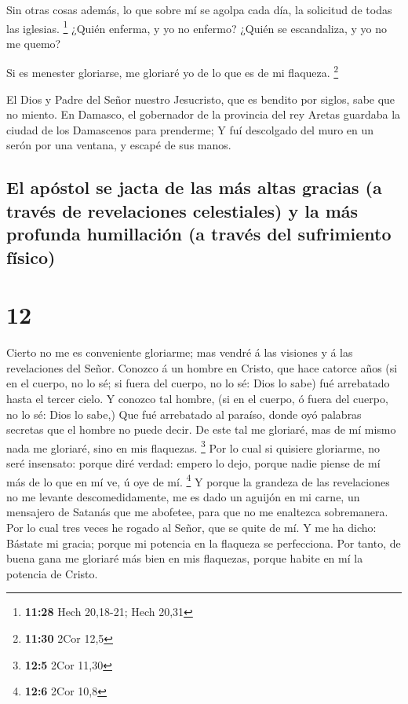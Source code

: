  Sin otras cosas además, lo que sobre mí se agolpa cada
día, la solicitud de todas las iglesias. \footnote{\textbf{11:28} Hech
  20,18-21; Hech 20,31}  ¿Quién enferma, y yo no enfermo?
¿Quién se escandaliza, y yo no me quemo?

 Si es menester gloriarse, me gloriaré yo de lo que es de
mi flaqueza. \footnote{\textbf{11:30} 2Cor 12,5}

 El Dios y Padre del Señor nuestro Jesucristo, que es
bendito por siglos, sabe que no miento.  En Damasco, el
gobernador de la provincia del rey Aretas guardaba la ciudad de los
Damascenos para prenderme;  Y fuí descolgado del muro en un
serón por una ventana, y escapé de sus manos.

\hypertarget{el-apuxf3stol-se-jacta-de-las-muxe1s-altas-gracias-a-travuxe9s-de-revelaciones-celestiales-y-la-muxe1s-profunda-humillaciuxf3n-a-travuxe9s-del-sufrimiento-fuxedsico}{%
\subsection{El apóstol se jacta de las más altas gracias (a través de
revelaciones celestiales) y la más profunda humillación (a través del
sufrimiento
físico)}\label{el-apuxf3stol-se-jacta-de-las-muxe1s-altas-gracias-a-travuxe9s-de-revelaciones-celestiales-y-la-muxe1s-profunda-humillaciuxf3n-a-travuxe9s-del-sufrimiento-fuxedsico}}

\hypertarget{section-11}{%
\section{12}\label{section-11}}

 Cierto no me es conveniente gloriarme; mas vendré á las
visiones y á las revelaciones del Señor.  Conozco á un
hombre en Cristo, que hace catorce años (si en el cuerpo, no lo sé; si
fuera del cuerpo, no lo sé: Dios lo sabe) fué arrebatado hasta el tercer
cielo.  Y conozco tal hombre, (si en el cuerpo, ó fuera del
cuerpo, no lo sé: Dios lo sabe,)  Que fué arrebatado al
paraíso, donde oyó palabras secretas que el hombre no puede decir.
 De este tal me gloriaré, mas de mí mismo nada me gloriaré,
sino en mis flaquezas. \footnote{\textbf{12:5} 2Cor 11,30} 
Por lo cual si quisiere gloriarme, no seré insensato: porque diré
verdad: empero lo dejo, porque nadie piense de mí más de lo que en mí
ve, ú oye de mí. \footnote{\textbf{12:6} 2Cor 10,8}  Y
porque la grandeza de las revelaciones no me levante descomedidamente,
me es dado un aguijón en mi carne, un mensajero de Satanás que me
abofetee, para que no me enaltezca sobremanera.  Por lo cual
tres veces he rogado al Señor, que se quite de mí.  Y me ha
dicho: Bástate mi gracia; porque mi potencia en la flaqueza se
perfecciona. Por tanto, de buena gana me gloriaré más bien en mis
flaquezas, porque habite en mí la potencia de Cristo.

